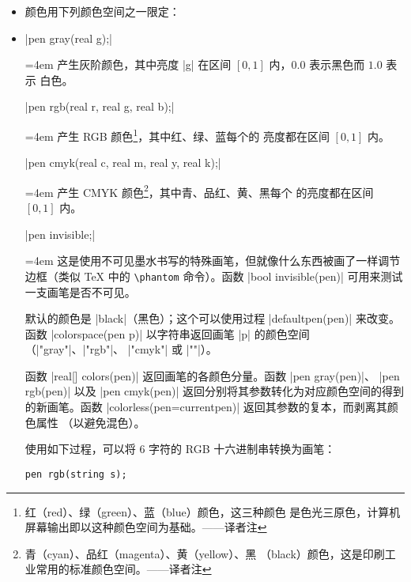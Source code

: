 \documentclass[nofonts,CJKnormalspaces]{ctexbook}[2009/05/20]
\newenvironment{funclist}{\trivlist
  \parindent=0pt
\item[]
  \def\item{\medskip\par\leftskip=0pt}
  \def\go{\par\leftskip=4em}}
{\endtrivlist}
\newcommand\transnote[1]{\footnote{#1——译者注}}
\begin{document}
\begin{itemize}
  \item 颜色用下列颜色空间之一限定：
\begin{funclist}
\item |pen gray(real g);| \go
  产生灰阶颜色，其中亮度 |g| 在区间 $[0,1]$ 内，$0.0$ 表示黑色而 $1.0$ 表示
  白色。

\item |pen rgb(real r, real g, real b);| \go
  产生 RGB 颜色\transnote{红（red）、绿（green）、蓝（blue）颜色，这三种颜色
  是色光三原色，计算机屏幕输出即以这种颜色空间为基础。}，其中红、绿、蓝每个的
  亮度都在区间 $[0,1]$ 内。

\item |pen cmyk(real c, real m, real y, real k);| \go
  产生 CMYK 颜色\transnote{青（cyan）、品红（magenta）、黄（yellow）、黑
  （black）颜色，这是印刷工业常用的标准颜色空间。}，其中青、品红、黄、黑每个
  的亮度都在区间 $[0,1]$ 内。

\item |pen invisible;| \go
  这是使用不可见墨水书写的特殊画笔，但就像什么东西被画了一样调节边框（类似
  \TeX{} 中的 \verb=\phantom= 命令）。函数 |bool invisible(pen)| 可用来测试
  一支画笔是否不可见。
\end{funclist}

默认的颜色是 |black|（黑色）；这个可以使用过程 |defaultpen(pen)| 来改变。函数
|colorspace(pen p)| 以字符串返回画笔 |p| 的颜色空间（|"gray"|、|"rgb"|、
|"cmyk"| 或 |""|）。

函数 |real[] colors(pen)| 返回画笔的各颜色分量。函数 |pen gray(pen)|、
|pen rgb(pen)| 以及 |pen cmyk(pen)| 返回分别将其参数转化为对应颜色空间的得到
的新画笔。函数 |colorless(pen=currentpen)| 返回其参数的复本，而剥离其颜色属性
（以避免混色）。

使用如下过程，可以将 6 字符的 RGB 十六进制串转换为画笔：
\begin{lstlisting}
pen rgb(string s);
\end{lstlisting}


\end{itemize}
\end{document}
